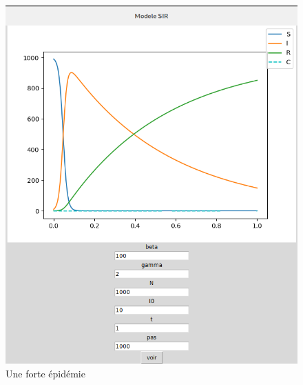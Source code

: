 \documentclass[a4paper]{article}
\theoremstyle{plain}
\theoremstyle{definition}
\theoremstyle{remark}
\begin{document}
\begin{figure}[h]
    \begin{minipage}[c]{.46\linewidth}
        \centering
        \includegraphics{forte_ep.png}
        \caption{Une forte épidémie}
    \end{minipage}
    \hfill%
    \begin{minipage}[c]{.46\linewidth}
        \centering

\end{minipage}
\end{figure}
\end{document}
